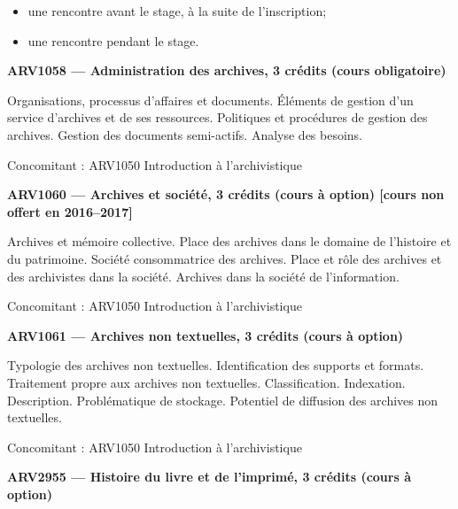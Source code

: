 \documentclass [12 pt]{article}
\begin{document}
        \begin{itemize}
        
                
        \item une rencontre avant le stage, à la suite de l'inscription;
                
        \item une rencontre pendant le stage.
            
        \end{itemize}
    
            
        \textbf{
        ARV1058 — Administration des archives, 3 crédits (cours obligatoire)
        }
    
            Organisations, processus d'affaires et documents. Éléments de gestion d'un service
                d'archives et de ses ressources. Politiques et procédures de gestion des archives.
                Gestion des documents semi-actifs. Analyse des besoins.
            
                Concomitant : ARV1050 Introduction à l'archivistique
            
            
        \textbf{
        ARV1060 — Archives et société, 3 crédits (cours à option) [cours non offert en
                2016–2017]
        }
    
            Archives et mémoire collective. Place des archives dans le domaine de l'histoire et
                du patrimoine. Société consommatrice des archives. Place et rôle des archives et des
                archivistes dans la société. Archives dans la société de l'information.
            
                Concomitant : ARV1050 Introduction à l'archivistique
            
            
        \textbf{
        ARV1061 — Archives non textuelles, 3 crédits (cours à option)
        }
    
            Typologie des archives non textuelles. Identification des supports et formats.
                Traitement propre aux archives non textuelles. Classification. Indexation.
                Description. Problématique de stockage. Potentiel de diffusion des archives non
                textuelles.
            
                Concomitant : ARV1050 Introduction à l'archivistique
            
            
        \textbf{
        ARV2955 — Histoire du livre et de l'imprimé, 3 crédits (cours à option)
        }
    
\end{document}
